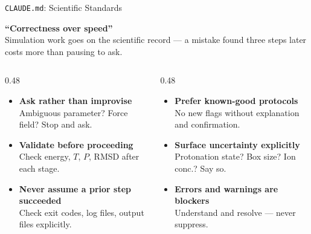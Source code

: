 \documentclass[aspectratio=169, 10pt]{beamer}
\begin{document}
\begin{frame}{\texttt{CLAUDE.md}: Scientific Standards}
  \begin{center}
    {\large\bfseries\color{biokteal}``Correctness over speed''}\\[0.3em]
    {\small Simulation work goes on the scientific record --- a mistake found three steps later costs more than pausing to ask.}
  \end{center}
  \vspace{0.4em}
  \begin{columns}[T]
    \begin{column}{0.48\textwidth}
      \begin{itemize}\setlength\itemsep{5pt}
        \item[\textbf{1.}] \textbf{Ask rather than improvise}\\
              {\small Ambiguous parameter? Force field? Stop and ask.}
        \item[\textbf{2.}] \textbf{Validate before proceeding}\\
              {\small Check energy, $T$, $P$, RMSD after each stage.}
        \item[\textbf{3.}] \textbf{Never assume a prior step succeeded}\\
              {\small Check exit codes, log files, output files explicitly.}
      \end{itemize}
    \end{column}
    \begin{column}{0.48\textwidth}
      \begin{itemize}\setlength\itemsep{5pt}
        \item[\textbf{4.}] \textbf{Prefer known-good protocols}\\
              {\small No new flags without explanation and confirmation.}
        \item[\textbf{5.}] \textbf{Surface uncertainty explicitly}\\
              {\small Protonation state? Box size? Ion conc.? Say so.}
        \item[\textbf{6.}] \textbf{Errors and warnings are blockers}\\
              {\small Understand and resolve --- never suppress.}
      \end{itemize}
    \end{column}
  \end{columns}
\end{frame}
\end{document}

